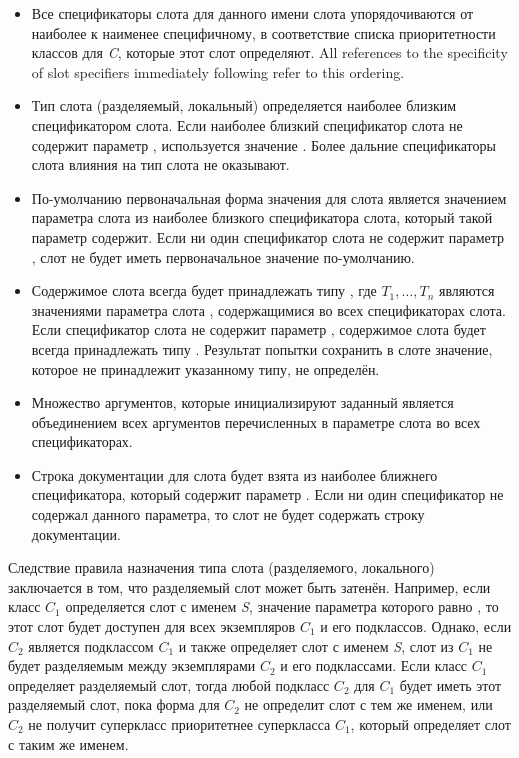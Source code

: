 \begin{itemize}

\item Все спецификаторы слота для данного имени слота упорядочиваются от
  наиболее к наименее специфичному, в соответствие списка приоритетности классов
  для \emph{C}, которые этот слот определяют. All references to the specificity
  of slot specifiers immediately following refer to this ordering.

\item Тип слота (разделяемый, локальный) определяется наиболее близким
  спецификатором слота. Если наиболее близкий спецификатор слота не содержит
  параметр , используется значение . Более
  дальние спецификаторы слота влияния на тип слота не
  оказывают.

\item По-умолчанию первоначальная форма значения для слота является значением
  параметра слота  из наиболее близкого спецификатора слота,
  который такой параметр содержит. Если ни один спецификатор слота не содержит
  параметр , слот не будет иметь первоначальное значение
  по-умолчанию.

\item Содержимое слота всегда будет принадлежать типу
  ,
  где $T_1, \ldots, T_{n}$ являются значениями параметра слота ,
  содержащимися во всех спецификаторах слота. Если спецификатор слота не содержит
  параметр , содержимое слота будет всегда принадлежать типу
  . Результат попытки сохранить в слоте значение, которое не
  принадлежит указанному типу, не определён.

\item Множество аргументов, которые инициализируют заданный является
  объединением всех аргументов перечисленных в параметре слота  во
  всех спецификаторах.

\item Строка документации для слота будет взята из наиболее ближнего
  спецификатора, который содержит параметр . Если ни один
  спецификатор не содержал данного параметра, то слот не будет содержать строку
  документации.
\end{itemize}

Следствие правила назначения типа слота (разделяемого, локального) заключается в
том, что разделяемый слот 
может быть затенён. Например, если класс $C_1$ определяется слот с именем
\emph{S}, значение параметра  которого равно , то
этот слот будет доступен для всех экземпляров $C_1$ и его подклассов. Однако,
если $C_2$ является подклассом $C_1$ и также определяет слот с именем \emph{S},
слот из $C_1$ не будет разделяемым между экземплярами $C_2$ и его
подклассами. Если класс $C_1$ определяет разделяемый слот, тогда любой подкласс
$C_2$ для $C_1$ будет иметь этот разделяемый слот, пока форма  для
$C_2$ не определит слот с тем же именем, или $C_2$ не получит суперкласс
приоритетнее суперкласса $C_1$, который определяет слот с таким же именем.

